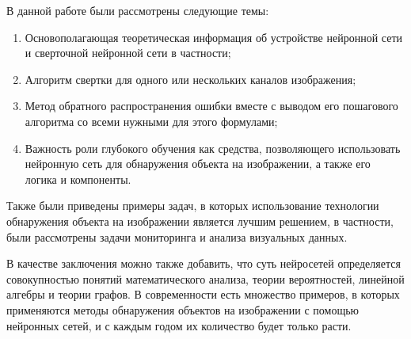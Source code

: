 \documentclass[bachelor, och, coursework]{SCWorks}
\begin{document}
\conclusion

    В данной работе были рассмотрены следующие темы:
    \begin{enumerate}
        \item Основополагающая теоретическая информация об устройстве нейронной сети и сверточной нейронной сети в частности;
        \item Алгоритм свертки для одного или нескольких каналов изображения;
        \item Метод обратного распространения ошибки вместе с выводом его пошагового алгоритма со всеми нужными для этого формулами;
        \item Важность роли глубокого обучения как средства, позволяющего использовать нейронную сеть для обнаружения объекта на изображении, а также его логика и компоненты.
    \end{enumerate}
    
    Также были приведены примеры задач, в которых использование технологии обнаружения объекта на изображении является лучшим решением, в частности, были рассмотрены задачи мониторинга и анализа визуальных данных.

    В качестве заключения можно также добавить, что суть нейросетей определяется совокупностью понятий математического анализа, теории вероятностей, линейной алгебры и теории графов. В современности есть множество примеров, в которых применяются методы обнаружения объектов на изображении с помощью нейронных сетей, и с каждым годом их количество будет только расти.
\end{document}
